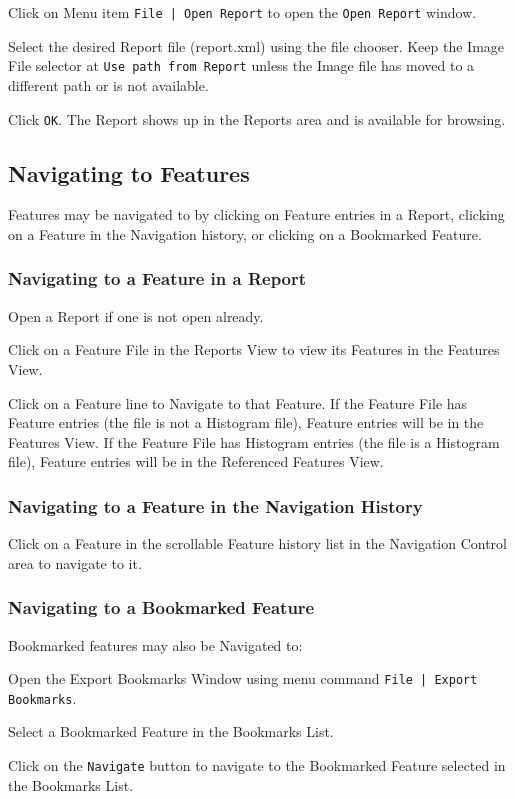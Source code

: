 \documentclass[10pt,twoside]{article}
\begin{document}
\begin{compactenum}
\item Click on Menu item \texttt{File | Open Report} to open the \texttt{Open Report} window.
\item Select the desired Report file (report.xml) using the file chooser.
Keep the Image File selector at \texttt{Use path from Report}
unless the Image file has moved to a different path or is not available.
\item Click \texttt{OK}.
The Report shows up in the Reports area and is available for browsing.
\end{compactenum}

\subsection{Navigating to Features}
Features may be navigated to by clicking on Feature entries in a Report,
clicking on a Feature in the Navigation history,
or clicking on a Bookmarked Feature.
\subsubsection{Navigating to a Feature in a Report}
\begin{compactenum}
\item Open a Report if one is not open already.
\item Click on a Feature File in the Reports View
to view its Features in the Features View.
\item Click on a Feature line to Navigate to that Feature.
If the Feature File has Feature entries (the file is not a Histogram file),
Feature entries will be in the Features View.
If the Feature File has Histogram entries (the file is a Histogram file),
Feature entries will be in the Referenced Features View.
\end{compactenum}

\subsubsection{Navigating to a Feature in the Navigation History}
Click on a Feature in the scrollable Feature history list in the Navigation Control area
to navigate to it.

\subsubsection{Navigating to a Bookmarked Feature}
Bookmarked features may also be Navigated to:
\begin{compactenum}
\item Open the Export Bookmarks Window using menu command \texttt{File | Export Bookmarks}.
\item Select a Bookmarked Feature in the Bookmarks List.
\item Click on the \texttt{Navigate} button to navigate to the Bookmarked Feature
selected in the Bookmarks List.
\end{compactenum}
\end{document}
